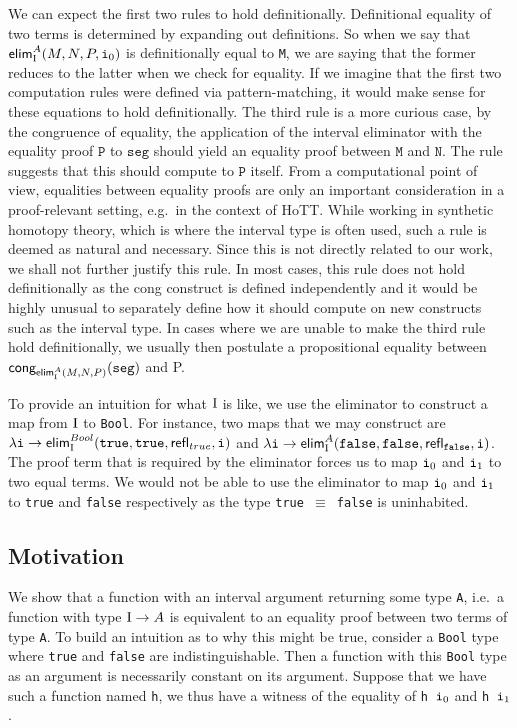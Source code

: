 \documentclass[12pt,twoside,maitrise]{dms}
\theoremstyle{definition}
\numberwithin{equation}{section}
\numberwithin{table}{chapter}
\numberwithin{figure}{chapter}
\newcommand\kw[1] {\textsf{#1}}
\newcommand\id[1] {\texttt{#1}}
\newcommand\fn[1] {\texttt{#1}}
\begin{document}
We can expect the first two rules to hold definitionally. Definitional equality
of two terms is determined by expanding out definitions. So when we say that
$\kw{elim}_{\bI}^{A}(M, N , P, \ileft)$ is definitionally equal to \id{M}, we
are saying that the former reduces to the latter when we check for equality. If
we imagine that the first two computation rules were defined via
pattern-matching, it would make sense for these equations to hold
definitionally. The third rule is a more curious case, by the congruence of
equality, the application of the interval eliminator with the equality proof
$\id{P}$ to $\id{seg}$ should yield an equality proof between $\id{M}$ and
$\id{N}$. The rule suggests that this should compute to $\id{P}$ itself. From a
computational point of view, equalities between equality proofs are only an
important consideration in a proof-relevant setting, e.g.\ in the context of
HoTT\@. While working in synthetic homotopy theory, which is where the interval
type is often used, such a rule is deemed as natural and necessary. Since this
is not directly related to our work, we shall not further justify this rule. In
most cases, this rule does not hold definitionally as the \kw{cong} construct is
defined independently and it would be highly unusual to separately define how it
should compute on new constructs such as the interval type. In cases where we
are unable to make the third rule hold definitionally, we usually then postulate
a propositional equality between $\kw{cong}_{\kw{elim}_{\bI}^{A}(M, N,
  P)}(\id{seg})$ and P.

To provide an intuition for what $\mathrm{I}$ is like, we use the eliminator to
construct a map from $\mathrm{I}$ to \id{Bool}. For instance, two maps that we may
construct are $\lambda \id{i} \rightarrow \kw{elim}_{\bI}^{Bool}(\id{true},
\id{true}, \kw{refl}_{true}, \id{i})$ and $\lambda \id{i} \rightarrow
\kw{elim}_{\bI}^{A}(\id{false}, \id{false}, \kw{refl}_{\id{false}}, \id{i})$.
The proof term that is required by the eliminator forces us to map $\ileft$ and
$\iright$ to two equal terms. We would not be able to use the
eliminator to map $\ileft$ and $\iright$ to \id{true} and \id{false}
respectively as the type \fn{true $\equiv$ false} is uninhabited.

\subsection{Motivation}
We show that a function with an interval argument returning some type \id{A},
i.e.\ a function with type \fn{$\mathrm{I} \rightarrow A$} is equivalent to an equality
proof between two terms of type \id{A}. To build an intuition as to why this
might be true, consider a \id{Bool} type where \id{true} and \id{false} are
indistinguishable. Then a function with this \id{Bool} type as an argument is
necessarily constant on its argument. Suppose that we have such a function named
\id{h}, we thus have a witness of the equality of \fn{h $\ileft$} and \fn{h
  $\iright$}.
\end{document}
